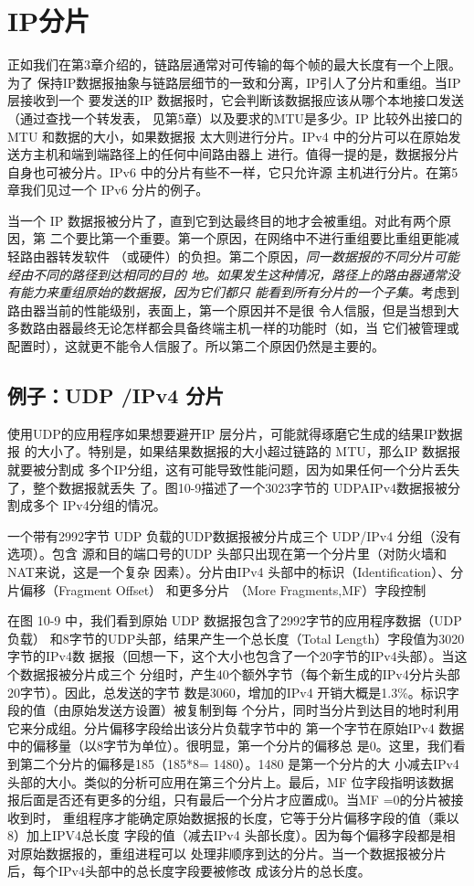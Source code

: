 \section{IP分片}
正如我们在第3章介绍的，链路层通常对可传输的每个帧的最大长度有一个上限。为了
保持IP数据报抽象与链路层细节的一致和分离，IP引人了分片和重组。当IP 层接收到一个
要发送的IP 数据报时，它会判断该数据报应该从哪个本地接口发送（通过查找一个转发表，
见第5章）以及要求的MTU是多少。IP 比较外出接口的MTU 和数据的大小，如果数据报
太大则进行分片。IPv4 中的分片可以在原始发送方主机和端到端路径上的任何中间路由器上
进行。值得一提的是，数据报分片自身也可被分片。IPv6 中的分片有些不一样，它只允许源
主机进行分片。在第5章我们见过一个 IPv6 分片的例子。

当一个 IP 数据报被分片了，直到它到达最终目的地才会被重组。对此有两个原因，第
二个要比第一个重要。第一个原因，在网络中不进行重组要比重组更能减轻路由器转发软件
（或硬件）的负担。第二个原因，\emph{同一数据报的不同分片可能经由不同的路径到达相同的目的
地。如果发生这种情况，路径上的路由器通常没有能力来重组原始的数据报，因为它们都只
能看到所有分片的一个子集。}考虑到路由器当前的性能级别，表面上，第一个原因并不是很
令人信服，但是当想到大多数路由器最终无论怎样都会具备终端主机一样的功能时（如，当
它们被管理或配置时），这就更不能令人信服了。所以第二个原因仍然是主要的。

\subsection{例子：UDP /IPv4 分片}

使用UDP的应用程序如果想要避开IP 层分片，可能就得琢磨它生成的结果IP数据报
的大小了。特别是，如果结果数据报的大小超过链路的 MTU，那么IP 数据报就要被分割成
多个IP分组，这有可能导致性能问题，因为如果任何一个分片丢失了，整个数据报就丢失
了。图10-9描述了一个3023字节的 UDPAIPv4数据报被分割成多个 IPv4分组的情况。

一个带有2992字节 UDP 负载的UDP数据报被分片成三个 UDP/IPv4 分组（没有选项）。包含
源和目的端口号的UDP 头部只出现在第一个分片里（对防火墙和 NAT来说，这是一个复杂
因素）。分片由IPv4 头部中的标识（Identification）、分片偏移（Fragment Offset） 和更多分片
（More Fragments,MF）字段控制

在图 10-9 中，我们看到原始 UDP 数据报包含了2992字节的应用程序数据（UDP 负载）
和8字节的UDP头部，结果产生一个总长度（Total Length）字段值为3020字节的IPv4数
据报（回想一下，这个大小也包含了一个20字节的IPv4头部）。当这个数据报被分片成三个
分组时，产生40个额外字节（每个新生成的IPv4分片头部20字节）。因此，总发送的字节
数是3060，增加的IPv4 开销大概是1.3\%。标识字段的值（由原始发送方设置）被复制到每
个分片，同时当分片到达目的地时利用它来分成组。分片偏移字段给出该分片负载字节中的
第一个字节在原始IPv4 数据中的偏移量（以8字节为单位）。很明显，第一个分片的偏移总
是0。这里，我们看到第二个分片的偏移是185（185*8= 1480）。1480 是第一个分片的大
小减去IPv4 头部的大小。类似的分析可应用在第三个分片上。最后，MF 位字段指明该数据
报后面是否还有更多的分组，只有最后一个分片才应置成0。当MF =0的分片被接收到时，
重组程序才能确定原始数据报的长度，它等于分片偏移字段的值（乘以8）加上IPV4总长度
字段的值（减去IPv4 头部长度）。因为每个偏移字段都是相对原始数据报的，重组进程可以
处理非顺序到达的分片。当一个数据报被分片后，每个IPv4头部中的总长度字段要被修改
成该分片的总长度。

